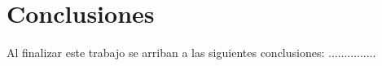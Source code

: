 \chapter*{Conclusiones}
Al finalizar este trabajo se arriban a las siguientes conclusiones:
...............